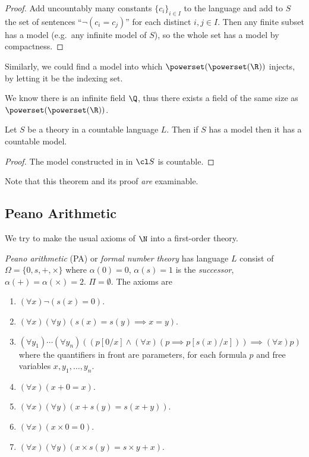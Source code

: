 \documentclass[a4paper]{article}
\begin{document}
\begin{proof}
  Add uncountably many constants \(\{c_i\}_{i \in I}\) to the language and add to \(S\) the set of sentences ``\(\neg(c_i = c_j)\)'' for each distinct \(i, j \in I\). Then any finite subset has a model (e.g.\ any infinite model of \(S\)), so the whole set has a model by compactness.
\end{proof}

Similarly, we could find a model into which \(\powerset (\powerset(\R))\) injects, by letting it be the indexing set.

\begin{eg}
  We know there is an infinite field \(\Q\), thus there exists a field of the same size as \(\powerset (\powerset(\R))\).
\end{eg}

\begin{corollary}
  Let \(S\) be a theory in a countable language \(L\). Then if \(S\) has a model then it has a countable model.
\end{corollary}

\begin{proof}
  The model constructed in  in \(\cl S\) is countable.
\end{proof}

Note that this theorem and its proof \emph{are} examinable.

\subsection{Peano Arithmetic}

We try to make the usual axioms of \(\N\) into a first-order theory.

\begin{definition}
  \emph{Peano arithmetic} (PA) or \emph{formal number theory} has language \(L\) consist of \(\Omega = \{0, s, + ,\times\}\) where \(\alpha(0) = 0\), \(\alpha(s) = 1\) is the \emph{successor}, \(\alpha(+) = \alpha(\times) = 2\). \(\Pi = \emptyset\). The axioms are
  \begin{enumerate}
  \item \((\forall x) \neg(s(x) = 0)\).
  \item \((\forall x)(\forall y) (s(x) = s(y) \implies x = y)\).
  \item \((\forall y_1)\cdots (\forall y_n) ((p[0/x] \land (\forall x) (p \implies p[s(x)/x])) \implies (\forall x) p)\) where the quantifiers in front are parameters, for each formula \(p\) and free variables \(x, y_1, \dots, y_n\).
  \item \((\forall x) (x + 0 = x)\).
  \item \((\forall x) (\forall y) (x + s(y) = s(x + y))\).
  \item \((\forall x) (x \times 0 = 0)\).
  \item \((\forall x)(\forall y) (x \times s(y) = s \times y + x)\).
  \end{enumerate}
\end{definition}
\end{document}
